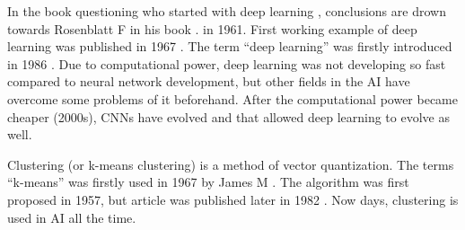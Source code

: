 In the book questioning who started with deep learning \parencite{tappert2019father}, conclusions are drown towards Rosenblatt F in his book \parencite{rosenblatt1961principles}. in 1961. First working example of deep learning was published in 1967 \parencite{ivakhnenko1967cybernetics}. The term “deep learning” was firstly introduced in 1986 \parencite{dechter1988network}. Due to computational power, deep learning was not developing so fast compared to neural network development, but other fields in the AI have overcome some problems of it beforehand. After the computational power became cheaper (2000s), CNNs have evolved and that allowed deep learning to evolve as well.
\newline

Clustering (or k-means clustering) is a method of vector quantization. The terms “k-means” was firstly used in 1967 by James M \parencite{huber1967proceedings}. The algorithm was first proposed in 1957, but article was published later in 1982 \parencite{lloyd1982least}. Now days, clustering is used in AI all the time.
